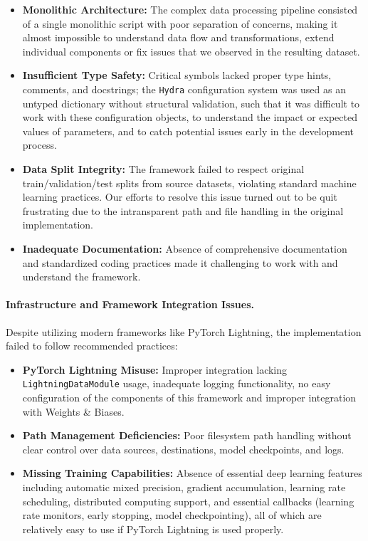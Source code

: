 \begin{itemize}[leftmargin=*]
    \item \textbf{Monolithic Architecture:} The complex data processing pipeline consisted of a single monolithic script with poor separation of concerns, making it almost impossible to understand data flow and transformations, extend individual components or fix issues that we observed in the resulting dataset.
    \item \textbf{Insufficient Type Safety:} Critical symbols lacked proper type hints, comments, and docstrings; the \texttt{Hydra} configuration system was used as an untyped dictionary without structural validation, such that it was difficult to work with these configuration objects, to understand the impact or expected values of parameters, and to catch potential issues early in the development process.
    \item \textbf{Data Split Integrity:} The framework failed to respect original train/validation/test splits from source datasets, violating standard machine learning practices. Our efforts to resolve this issue turned out to be quit frustrating due to the intransparent path and file handling in the original implementation.
    \item \textbf{Inadequate Documentation:} Absence of comprehensive documentation and standardized coding practices made it challenging to work with and understand the framework.
\end{itemize}

\paragraph{Infrastructure and Framework Integration Issues.}
Despite utilizing modern frameworks like PyTorch Lightning, the implementation failed to follow recommended practices:

\begin{itemize}[leftmargin=*]
    \item \textbf{PyTorch Lightning Misuse:} Improper integration lacking \texttt{LightningDataModule} usage, inadequate logging functionality, no easy configuration of the components of this framework and improper integration with Weights \& Biases.
    \item \textbf{Path Management Deficiencies:} Poor filesystem path handling without clear control over data sources, destinations, model checkpoints, and logs.
    \item \textbf{Missing Training Capabilities:} Absence of essential deep learning features including automatic mixed precision, gradient accumulation, learning rate scheduling, distributed computing support, and essential callbacks (learning rate monitors, early stopping, model checkpointing), all of which are relatively easy to use if PyTorch Lightning is used properly.
\end{itemize}



